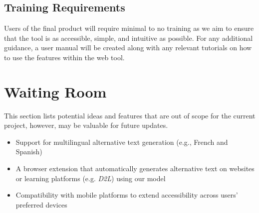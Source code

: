 \documentclass[12pt]{article}
\begin{document}
\subsection{Training Requirements}
Users of the final product will require minimal to no training as we
aim to ensure that the tool is as accessible, simple, and intuitive
as possible. For any additional guidance,
a user manual will be created along with any relevant tutorials on
how to use the features within the web tool.

\section{Waiting Room}
This section lists potential ideas and features that are out of scope
for the current project, however, may be valuable for future updates.
\begin{itemize}
  \item Support for multilingual alternative text generation (e.g.,
    French and Spanish)
  \item A browser extension that automatically generates alternative
    text on websites or learning platforms (e.g. \textit{D2L}) using our model
  \item Compatibility with mobile platforms to extend accessibility
    across users' preferred devices
\end{itemize}
\end{document}
